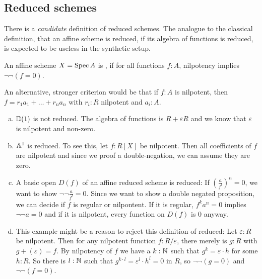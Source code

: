 
\subsection{Reduced schemes}

There is a \emph{candidate} definition of reduced schemes.
The analogue to the classical definition, that an affine scheme is reduced,
if its algebra of functions is reduced, is expected to be useless in the synthetic setup.

\begin{definition}
  An affine scheme $X=\operatorname{Spec} A$ is ,
  if for all functions $f:A$, nilpotency implies $\neg\neg (f=0)$.
\end{definition}

An alternative, stronger criterion would be that if $f : A$ is nilpotent, then
$f = r_1 a_1 + \ldots + r_n a_n$ with $r_i : R$ nilpotent and $a_i : A$.

\begin{example}
  \begin{enumerate}[(a)]
  \item $\mathbb{D}(1)$ is not reduced.
    The algebra of functions is $R+\varepsilon R$ and we know that $\varepsilon$ is nilpotent and non-zero.
  \item $\mathbb{A}^1$ is reduced. To see this, let $f:R[X]$ be nilpotent.
    Then all coefficients of $f$ are nilpotent and since we proof a double-negation,
    we can assume they are zero.
  \item A basic open $D(f)$ of an affine reduced scheme is reduced:
    If $\left(\frac{a}{f^l}\right)^n=0$, we want to show $\neg\neg \frac{a}{f^l} = 0$.
    Since we want to show a double negated proposition, we can decide if $f$ is regular or nilpontent.
    If it is regular, $f^ka^n=0$ implies $\neg\neg a = 0$ and if it is nilpotent, every function on $D(f)$ is $0$ anyway.
  \item This example might be a reason to reject this definition of reduced:
    Let $\varepsilon:R$ be nilpotent.
    Then for any nilpotent function $f:R/\varepsilon$, there merely is $g:R$ with $g+(\varepsilon)=f$.
    By nilpotency of $f$ we have a $k:\mathbb{N}$ such that $g^k=\varepsilon\cdot h$ for some $h:R$.
    So there is $l:\mathbb{N}$ such that $g^{k\cdot l}=\varepsilon^l\cdot h^l=0$ in $R$, so $\neg\neg (g=0)$ and $\neg\neg (f=0)$.
  \end{enumerate}
\end{example}

